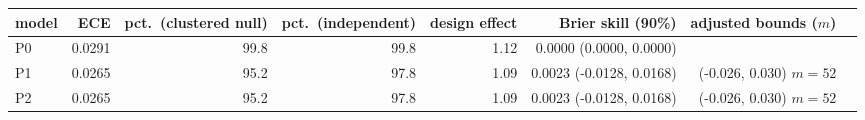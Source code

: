 \begin{tabular}{lrrrrrrr}
\toprule
model & ECE & pct.\ (clustered null) & pct.\ (independent) & design effect & Brier skill (90\%) & adjusted bounds ($m$) \\
\midrule
P0 & 0.0291 & 99.8 & 99.8 & 1.12 & 0.0000 (0.0000, 0.0000) &  \\
P1 & 0.0265 & 95.2 & 97.8 & 1.09 & 0.0023 (-0.0128, 0.0168) & (-0.026, 0.030) $m=52$ \\
P2 & 0.0265 & 95.2 & 97.8 & 1.09 & 0.0023 (-0.0128, 0.0168) & (-0.026, 0.030) $m=52$ \\
\bottomrule
\end{tabular}
